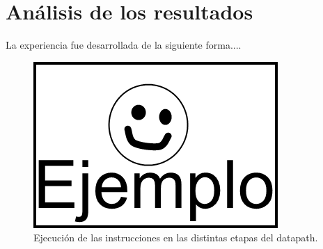 \section{Análisis de los resultados}

La experiencia fue desarrollada de la siguiente forma....

\begin{figure}[!ht]
	\centering
	\includegraphics[scale=0.4]{images/Ejemplo.png}
	\caption{Ejecución de las instrucciones en las distintas etapas del datapath.}
	\label{fig:ej}
\end{figure}



